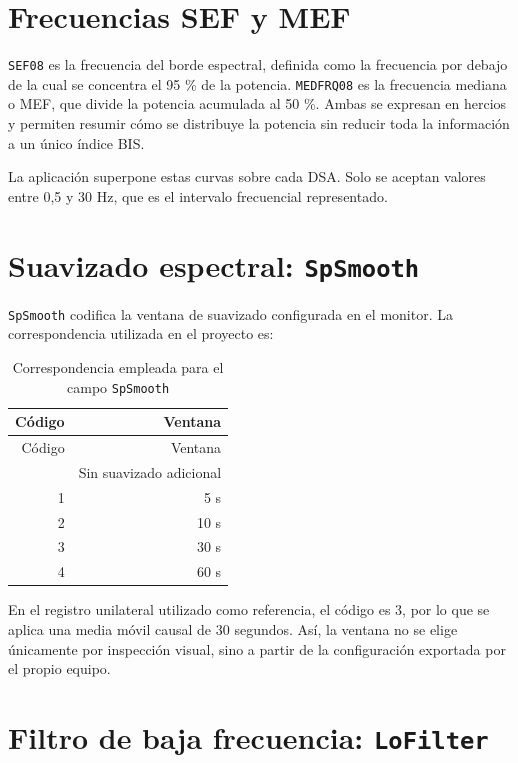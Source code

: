 \documentclass[
  spanish,
  a4paper,
  12pt,
  twoside]{memoir}
\begin{document}
\section{Frecuencias SEF y MEF}\label{frecuencias-sef-y-mef}

\texttt{SEF08} es la frecuencia del borde espectral, definida como la
frecuencia por debajo de la cual se concentra el 95 \% de la potencia.
\texttt{MEDFRQ08} es la frecuencia mediana o MEF, que divide la potencia
acumulada al 50 \%. Ambas se expresan en hercios y permiten resumir cómo
se distribuye la potencia sin reducir toda la información a un único
índice BIS.

La aplicación superpone estas curvas sobre cada DSA. Solo se aceptan
valores entre 0,5 y 30 Hz, que es el intervalo frecuencial representado.

\section{\texorpdfstring{Suavizado espectral:
\texttt{SpSmooth}}{Suavizado espectral: SpSmooth}}\label{suavizado-espectral-spsmooth}

\texttt{SpSmooth} codifica la ventana de suavizado configurada en el
monitor. La correspondencia utilizada en el proyecto es:

\begin{longtable}[]{@{}rr@{}}
\caption{Correspondencia empleada para el campo
\protect\texttt{SpSmooth}}\label{tbl-spsmooth}\tabularnewline
\toprule\noalign{}
Código & Ventana \\
\midrule\noalign{}
\endfirsthead
\toprule\noalign{}
Código & Ventana \\
\midrule\noalign{}
\endhead
\bottomrule\noalign{}
\endlastfoot
0 & Sin suavizado adicional \\
1 & 5 s \\
2 & 10 s \\
3 & 30 s \\
4 & 60 s \\
\end{longtable}

En el registro unilateral utilizado como referencia, el código es 3, por
lo que se aplica una media móvil causal de 30 segundos. Así, la ventana
no se elige únicamente por inspección visual, sino a partir de la
configuración exportada por el propio equipo.

\section{\texorpdfstring{Filtro de baja frecuencia:
\texttt{LoFilter}}{Filtro de baja frecuencia: LoFilter}}\label{filtro-de-baja-frecuencia-lofilter}
\end{document}
